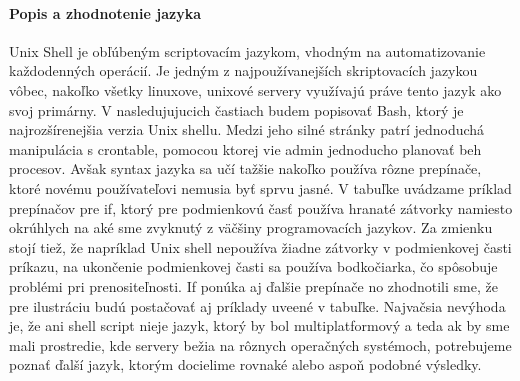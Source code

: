 \paragraph{Popis a zhodnotenie jazyka}
\indent
Unix Shell je obľúbeným scriptovacím jazykom, vhodným na automatizovanie každodenných operácií. Je jedným z najpoužívanejších skriptovacích jazykou vôbec, nakoľko všetky linuxove, unixové servery využívajú práve tento jazyk ako svoj primárny. V nasledujujucich častiach budem popisovať Bash, ktorý je najrozšírenejšia verzia Unix shellu.
Medzi jeho silné stránky patrí jednoduchá manipulácia s crontable, pomocou ktorej vie admin jednoducho planovať beh procesov.
Avšak syntax jazyka sa učí tažšie nakoľko používa rôzne prepínače, ktoré novému používateľovi nemusia byť sprvu jasné.
V tabuľke uvádzame príklad prepínačov pre if, ktorý pre podmienkovú časť používa hranaté zátvorky namiesto okrúhlych na aké sme zvyknutý z väčšiny programovacích jazykov. Za zmienku stojí tiež, že napríklad Unix shell nepoužíva žiadne zátvorky v podmienkovej časti príkazu, na ukončenie podmienkovej časti sa používa bodkočiarka, čo spôsobuje problémi pri prenositeľnosti. If ponúka aj ďalšie prepínače no zhodnotili sme, že pre ilustráciu budú postačovať aj príklady uveené v tabuľke.
Najvačsia nevýhoda je, že ani shell script nieje jazyk, ktorý by bol multiplatformový a teda ak by sme mali prostredie, kde servery bežia na rôznych operačných systémoch, potrebujeme poznať ďalší jazyk, ktorým docielime rovnaké alebo aspoň podobné výsledky.
\newline

